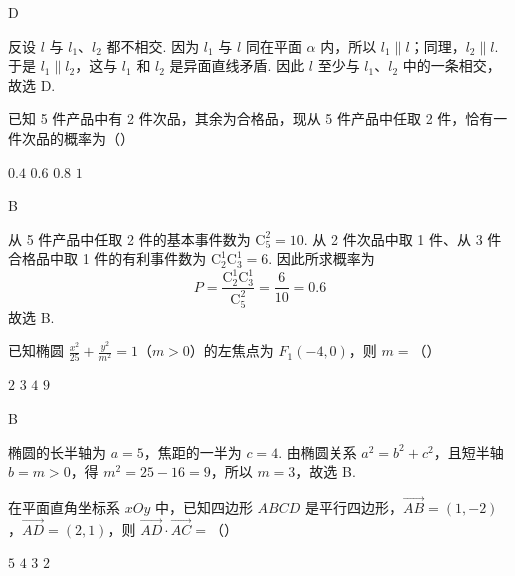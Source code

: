 \begin{answer}
D
\end{answer}

\begin{solution}
反设 \(l\) 与 \(l_1\)、\(l_2\) 都不相交. 因为 \(l_1\) 与 \(l\) 同在平面 \(\alpha\) 内，所以 \(l_1\parallel l\)；同理，\(l_2\parallel l\). 于是 \(l_1\parallel l_2\)，这与 \(l_1\) 和 \(l_2\) 是异面直线矛盾. 因此 \(l\) 至少与 \(l_1\)、\(l_2\) 中的一条相交，故选 D.
\end{solution}

\begin{problem}
已知 5 件产品中有 2 件次品，其余为合格品，现从 5 件产品中任取 2 件，恰有一件次品的概率为（\quad）

\choices
    {\(0.4\)}
    {\(0.6\)}
    {\(0.8\)}
    {\(1\)}
\end{problem}

\begin{answer}
B
\end{answer}

\begin{solution}
从 5 件产品中任取 2 件的基本事件数为 \(\mathrm C_5^2=10\). 从 2 件次品中取 1 件、从 3 件合格品中取 1 件的有利事件数为 \(\mathrm C_2^1\mathrm C_3^1=6\). 因此所求概率为
\[
P=\frac{\mathrm C_2^1\mathrm C_3^1}{\mathrm C_5^2}=\frac{6}{10}=0.6
\]
故选 B.
\end{solution}

\begin{problem}
已知椭圆 \(\frac{x^2}{25} + \frac{y^2}{m^2} = 1\)（\(m > 0\)）的左焦点为 \(F_{1}(-4,0)\)，则 \(m =\)（\quad）

\choices
    {\(2\)}
    {\(3\)}
    {\(4\)}
    {\(9\)}
\end{problem}

\begin{answer}
B
\end{answer}

\begin{solution}
椭圆的长半轴为 \(a=5\)，焦距的一半为 \(c=4\). 由椭圆关系 \(a^2=b^2+c^2\)，且短半轴 \(b=m>0\)，得 \(m^2=25-16=9\)，所以 \(m=3\)，故选 B.
\end{solution}

\begin{problem}
在平面直角坐标系 \(xOy\) 中，已知四边形 \(ABCD\) 是平行四边形，\(\overrightarrow{AB} = \left(1, -2\right)\)，\(\overrightarrow{AD} = \left(2, 1\right)\)，则 \(\overrightarrow{AD} \cdot \overrightarrow{AC} =\)（\quad）

\choices
    {\(5\)}
    {\(4\)}
    {\(3\)}
    {\(2\)}
\end{problem}

